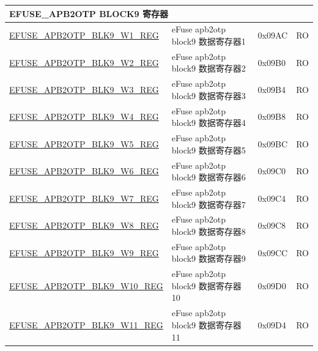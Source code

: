 \begin{longtable}{ | p{7cm} | p{6cm} | p{1.2cm} | p{1.5cm} | }
\multicolumn{4}{|l|}{\textbf{EFUSE\_APB2OTP BLOCK9 寄存器}} \\ \hline
\hyperref[regdesc:EFUSEAPB2OTPBLK9WNREG]{EFUSE\_APB2OTP\_BLK9\_W1\_REG} & eFuse apb2otp block9 数据寄存器1 & 0x09AC & RO \\\hline
\hyperref[regdesc:EFUSEAPB2OTPBLK9WNREG]{EFUSE\_APB2OTP\_BLK9\_W2\_REG} & eFuse apb2otp block9 数据寄存器2 & 0x09B0 & RO \\\hline
\hyperref[regdesc:EFUSEAPB2OTPBLK9WNREG]{EFUSE\_APB2OTP\_BLK9\_W3\_REG} & eFuse apb2otp block9 数据寄存器3 & 0x09B4 & RO \\\hline
\hyperref[regdesc:EFUSEAPB2OTPBLK9WNREG]{EFUSE\_APB2OTP\_BLK9\_W4\_REG} & eFuse apb2otp block9 数据寄存器4 & 0x09B8 & RO \\\hline
\hyperref[regdesc:EFUSEAPB2OTPBLK9WNREG]{EFUSE\_APB2OTP\_BLK9\_W5\_REG} & eFuse apb2otp block9 数据寄存器5 & 0x09BC & RO \\\hline
\hyperref[regdesc:EFUSEAPB2OTPBLK9WNREG]{EFUSE\_APB2OTP\_BLK9\_W6\_REG} & eFuse apb2otp block9 数据寄存器6 & 0x09C0 & RO \\\hline
\hyperref[regdesc:EFUSEAPB2OTPBLK9WNREG]{EFUSE\_APB2OTP\_BLK9\_W7\_REG} & eFuse apb2otp block9 数据寄存器7 & 0x09C4 & RO \\\hline
\hyperref[regdesc:EFUSEAPB2OTPBLK9WNREG]{EFUSE\_APB2OTP\_BLK9\_W8\_REG} & eFuse apb2otp block9 数据寄存器8 & 0x09C8 & RO \\\hline
\hyperref[regdesc:EFUSEAPB2OTPBLK9WNREG]{EFUSE\_APB2OTP\_BLK9\_W9\_REG} & eFuse apb2otp block9 数据寄存器9 & 0x09CC & RO \\\hline
\hyperref[regdesc:EFUSEAPB2OTPBLK9WNREG]{EFUSE\_APB2OTP\_BLK9\_W10\_REG} & eFuse apb2otp block9 数据寄存器10 & 0x09D0 & RO \\\hline
\hyperref[regdesc:EFUSEAPB2OTPBLK9WNREG]{EFUSE\_APB2OTP\_BLK9\_W11\_REG} & eFuse apb2otp block9 数据寄存器11 & 0x09D4 & RO \\\hline



\end{longtable}
